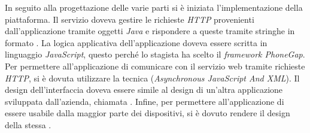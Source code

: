In seguito alla progettazione delle varie parti si è iniziata l'implementazione della piattaforma. Il servizio doveva gestire le richieste \textit{HTTP} provenienti dall'applicazione tramite oggetti  \textit{Java} e rispondere a queste tramite stringhe in formato .
La logica applicativa dell'applicazione doveva essere scritta in linguaggio \textit{JavaScript}, questo perché lo stagista ha scelto il \textit{framework PhoneGap}. Per permettere all'applicazione di comunicare con il servizio web tramite richieste \textit{HTTP}, si è dovuta utilizzare la tecnica  (\textit{Asynchronous JavaScript And XML}).
Il design dell'interfaccia doveva essere simile al design di un'altra applicazione sviluppata dall'azienda, chiamata . Infine, per permettere all'applicazione di essere usabile dalla maggior parte dei dispositivi, si è dovuto rendere il design della stessa .

%
%

\endgroup			

\vfill

